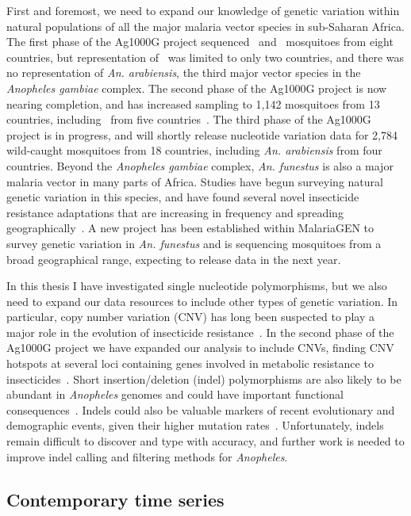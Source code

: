 \documentclass[a4paper,11pt,abstracton,hidelinks]{scrartcl}
\begin{document}
First and foremost, we need to expand our knowledge of genetic variation within natural populations of all the major malaria vector species in sub-Saharan Africa.
%
The first phase of the Ag1000G project sequenced \agam\ and \acol\ mosquitoes from eight countries, but representation of \acol\ was limited to only two countries, and there was no representation of \textit{An. arabiensis}, the third major vector species in the \textit{Anopheles gambiae} complex.
%
The second phase of the Ag1000G project is now nearing completion, and has increased sampling to 1,142 mosquitoes from 13 countries, including \acol\ from five countries~\parencite{Ag1000G2020}.
%
The third phase of the Ag1000G project is in progress, and will shortly release nucleotide variation data for 2,784 wild-caught mosquitoes from 18 countries, including \textit{An. arabiensis} from four countries.
%
Beyond the \textit{Anopheles gambiae} complex, \textit{An. funestus} is also a major malaria vector in many parts of Africa.
%
Studies have begun surveying natural genetic variation in this species, and have found several novel insecticide resistance adaptations that are increasing in frequency and spreading geographically~\parencite{Weedall2020}.
%
A new project has been established within MalariaGEN to survey genetic variation in \textit{An. funestus} and is sequencing mosquitoes from a broad geographical range, expecting to release data in the next year.


In this thesis I have investigated single nucleotide polymorphisms, but we also need to expand our data resources to include other types of genetic variation.
%
In particular, copy number variation (CNV) has long been suspected to play a major role in the evolution of insecticide resistance~\parencite{Devonshire1991,Hemingway1998,Bass2011}.
%
In the second phase of the Ag1000G project we have expanded our analysis to include CNVs, finding CNV hotspots at several loci containing genes involved in metabolic resistance to insecticides~\parencite{Lucas2019}.
%
Short insertion/deletion (indel) polymorphisms are also likely to be abundant in \textit{Anopheles} genomes and could have important functional consequences~\parencite{Montgomery2013}.
%
Indels could also be valuable markers of recent evolutionary and demographic events, given their higher mutation rates~\parencite{Redmond2018}.
%
Unfortunately, indels remain difficult to discover and type with accuracy, and further work is needed to improve indel calling and filtering methods for \textit{Anopheles}.


\subsection{Contemporary time series}
\end{document}
